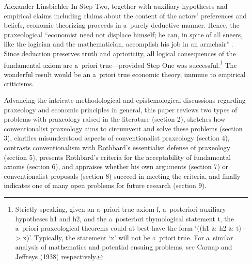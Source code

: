 \begin{artengenv}{Alexander Linsbichler}
In Step Two, together with auxiliary hypotheses and empirical claims including claims about the content of the actors' preferences and beliefs, economic theorizing proceeds in a~purely deductive manner. Hence, the praxeological ``economist need not displace himself; he can, in spite of all sneers, like the logician and the mathematician, accomplish his job in an armchair'' 
\parencite[][p.78]{mises_ultimate_2012}. %
 Since deduction preserves truth and aprioricity, all logical consequences of the fundamental axiom are a~priori true---provided Step One was successful.\footnote{Strictly speaking, given an a~priori true axiom f, a~posteriori auxiliary hypotheses h1 and h2, and the a~posteriori thymological statement t, the a~priori praxeological theorems could at best have the form ‘((h1 \& h2 \& t) -{\textgreater} x)'. Typically, the statement ‘x' will not be a~priori true. For a~similar analysis of mathematics and potential ensuing problems, see Carnap 
\parencites*[][]{carnap_foundations_1955}[][]{carnap_untersuchungen_2000} %
 and Jeffreys 
\parencite*[][]{jeffreys_nature_1938}%
(1938) respectively.} The wonderful result would be an a~priori true economic theory, immune to empirical criticisms.



Advancing the intricate methodological and epistemological discussions regarding praxeology and economic principles in general, this paper reviews two types of problems with praxeology raised in the literature (section 2), sketches how conventionalist praxeology aims to circumvent and solve these problems (section 3), clarifies misunderstood aspects of conventionalist praxeology (section 4), contrasts conventionalism with Rothbard's essentialist defense of praxeology (section 5), presents Rothbard's criteria for the acceptability of fundamental axioms (section 6), and appraises whether his own arguments (section 7) or conventionalist proposals (section 8) succeed in meeting the criteria, and finally indicates one of many open problems for future research (section 9).




\end{artengenv}
